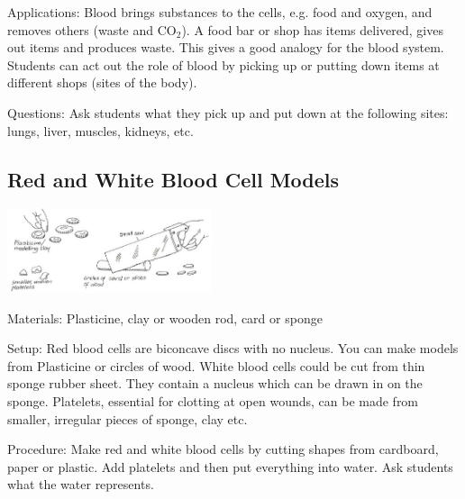 \begin{multicols}{2}
\begin{description*}
\item[Applications:]{Blood brings substances to the
cells, e.g. food and oxygen, and
removes others (waste and CO$_2$).
A food bar or shop has items
delivered, gives out items and
produces waste. This gives a good
analogy for the blood system.
Students can act out the role of
blood by picking up or putting
down items at different shops
(sites of the body).}
\item[Questions:]{Ask students what they pick up and put down at the following sites: lungs, liver, muscles, kidneys, etc.}
\end{description*}

\subsection{Red and White Blood Cell Models} %

\begin{center}
\includegraphics[width=0.45\textwidth]{./img/vso/red-white-model.jpg}
\end{center}

\begin{description*}
\item[Materials:]{Plasticine, clay or wooden rod, card or sponge}
\item[Setup:]{Red blood cells are biconcave discs with no nucleus. You can make
models from Plasticine or circles of wood. White blood cells could be
cut from thin sponge rubber sheet. They contain a nucleus which can
be drawn in on the sponge. Platelets, essential for clotting at open
wounds, can be made from smaller, irregular pieces of sponge, clay etc. }
\item[Procedure:]{Make red and white blood cells
by cutting shapes from cardboard,
paper or plastic.
Add platelets and then put
everything into water. Ask
students what the water
represents.}
\end{description*}


\end{multicols}
